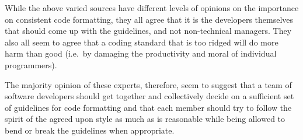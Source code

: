 While the above varied sources have different levels of opinions on the
importance on consistent code formatting, they all agree that it is the
developers themselves that should come up with the guidelines, and not
non-technical managers.  They also all seem to agree that a coding standard
that is too ridged will do more harm than good (i.e.\ by damaging the
productivity and moral of individual programmers).

The majority opinion of these experts, therefore, seem to suggest that a team
of software developers should get together and collectively decide on a
sufficient set of guidelines for code formatting and that each member should
try to follow the spirit of the agreed upon style as much as is reasonable
while being allowed to bend or break the guidelines when appropriate.
